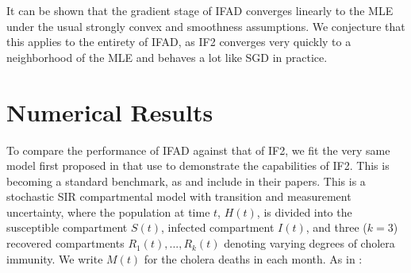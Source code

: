 \documentclass{article}
\begin{document}
It can be shown that the gradient stage of IFAD converges linearly to the MLE under the usual strongly convex and smoothness assumptions. We conjecture that this applies to the entirety of IFAD, as IF2 converges very quickly to a neighborhood of the MLE and behaves a lot like SGD in practice.

\section{Numerical Results}


To compare the performance of IFAD against that of IF2, we fit the very same model first proposed in \cite{king08} that \cite{ionides15} use to demonstrate the capabilities of IF2. This is becoming a standard benchmark, as \cite{wood16} and \cite{wycoff2024voronoi} include in their papers. This is a stochastic SIR compartmental model with transition and measurement uncertainty, where the population at time $t$, $H(t)$, is divided into the susceptible compartment $S(t)$, infected compartment $I(t)$, and three ($k=3$) recovered compartments $R_1(t), ..., R_k(t)$ denoting varying degrees of cholera immunity. We write $M(t)$ for the cholera deaths in each month. As in \cite{ionides15}:
\end{document}
